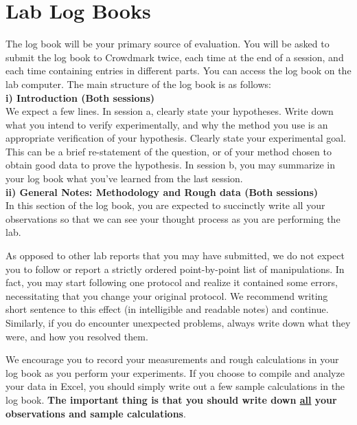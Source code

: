 \documentclass[12pt]{report}
\begin{document}
\section{Lab Log Books}
The log book will be your primary source of evaluation. You will be asked to submit the log book to Crowdmark twice, each time at the end of a session, and each time containing entries in different parts. You can access the log book on the lab computer. The main structure of the log book is as follows:\\
 
\noindent \textbf{i) Introduction (Both sessions)} \\
\noindent We expect a few lines. In session a, clearly state your hypotheses. Write down what you intend to verify experimentally, and why the method you use is an appropriate verification of your hypothesis. Clearly state your experimental goal. This can be a brief re-statement of the question, or of your method chosen to obtain good data to prove the hypothesis.
In session b, you may summarize in your log book what you've learned from the last session. \\

\noindent \textbf{ii) General Notes: Methodology and Rough data (Both sessions)} \\
In this section of the log book, you are  expected to succinctly write all your observations so that we can see your thought process as you are performing the lab. 

As opposed to other lab reports that you may have submitted, we do not expect you to follow or report a strictly ordered point-by-point list of manipulations. In fact, you may start following one protocol and realize it contained  some errors, necessitating that you change your original protocol. We recommend writing short sentence to this effect (in intelligible and readable notes) and continue. Similarly, if you do encounter unexpected problems, always write down what they were, and how you resolved them.

We encourage you to record your measurements and rough calculations in your log book as you perform your experiments. If you choose to compile and analyze your data in Excel, you should simply write out a few sample calculations in the log book. 
\textbf{ The important thing is that you should write down \underline{all} your observations and sample calculations}. 
\end{document}
